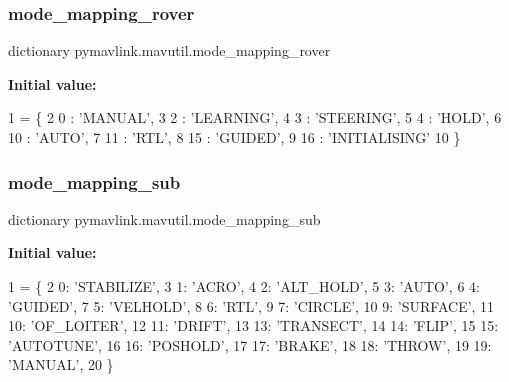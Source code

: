 \subsubsection{\texorpdfstring{mode\+\_\+mapping\+\_\+rover}{mode\_mapping\_rover}}
{\footnotesize\ttfamily dictionary pymavlink.\+mavutil.\+mode\+\_\+mapping\+\_\+rover}

{\bfseries Initial value\+:}
\begin{DoxyCode}
1 =  \{
2     0 : \textcolor{stringliteral}{'MANUAL'},
3     2 : \textcolor{stringliteral}{'LEARNING'},
4     3 : \textcolor{stringliteral}{'STEERING'},
5     4 : \textcolor{stringliteral}{'HOLD'},
6     10 : \textcolor{stringliteral}{'AUTO'},
7     11 : \textcolor{stringliteral}{'RTL'},
8     15 : \textcolor{stringliteral}{'GUIDED'},
9     16 : \textcolor{stringliteral}{'INITIALISING'}
10     \}
\end{DoxyCode}
\mbox{\label{namespacepymavlink_1_1mavutil_a5472e17a46fef18aa4f73d62c5a7c40a}} 
\subsubsection{\texorpdfstring{mode\+\_\+mapping\+\_\+sub}{mode\_mapping\_sub}}
{\footnotesize\ttfamily dictionary pymavlink.\+mavutil.\+mode\+\_\+mapping\+\_\+sub}

{\bfseries Initial value\+:}
\begin{DoxyCode}
1 =  \{
2     0: \textcolor{stringliteral}{'STABILIZE'},
3     1: \textcolor{stringliteral}{'ACRO'},
4     2: \textcolor{stringliteral}{'ALT\_HOLD'},
5     3: \textcolor{stringliteral}{'AUTO'},
6     4: \textcolor{stringliteral}{'GUIDED'},
7     5: \textcolor{stringliteral}{'VELHOLD'},
8     6: \textcolor{stringliteral}{'RTL'},
9     7: \textcolor{stringliteral}{'CIRCLE'},
10     9: \textcolor{stringliteral}{'SURFACE'},
11     10: \textcolor{stringliteral}{'OF\_LOITER'},
12     11: \textcolor{stringliteral}{'DRIFT'},
13     13: \textcolor{stringliteral}{'TRANSECT'},
14     14: \textcolor{stringliteral}{'FLIP'},
15     15: \textcolor{stringliteral}{'AUTOTUNE'},
16     16: \textcolor{stringliteral}{'POSHOLD'},
17     17: \textcolor{stringliteral}{'BRAKE'},
18     18: \textcolor{stringliteral}{'THROW'},
19     19: \textcolor{stringliteral}{'MANUAL'},
20     \}
\end{DoxyCode}
\mbox{\label{namespacepymavlink_1_1mavutil_ae19716483a060aee074801e40554ca42}} 
